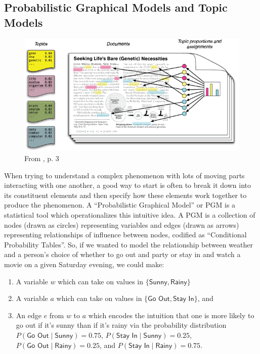 \begin{subappendices}

\section{Probabilistic Graphical Models and Topic Models\label{app:pgms}}

\begin{figure}
    \centering
    \includegraphics[width=\textwidth]{ch1_figs/blei_lda.png}
    \caption{From \cite{blei_introduction_2012}, p. 3}
    \label{fig:my_label}
\end{figure}

When trying to understand a complex phenomenon with lots of moving parts interacting with one another, a good way to start is often to break it down into its constituent elements and then specify how these elements work together to produce the phenomenon. A ``Probabilistic Graphical Model'' or PGM is a statistical tool which operationalizes this intuitive idea. A PGM is a collection of nodes (drawn as circles) representing variables and edges (drawn as arrows) representing relationships of influence between nodes, codified as ``Conditional Probability Tables''. So, if we wanted to model the relationship between weather and a person's choice of whether to go out and party or stay in and watch a movie on a given Saturday evening, we could make:

\begin{enumerate}
    \item A variable $w$ which can take on values in $\{\textsf{Sunny}, \textsf{Rainy}\}$
    \item A variable $a$ which can take on values in $\{\textsf{Go Out}, \textsf{Stay In}\}$, and 
    \item An edge $e$ from $w$ to $a$ which encodes the intuition that one is more likely to go out if it's sunny than if it's rainy via the probability distribution $P(\textsf{Go Out} \; | \; \textsf{Sunny}) = 0.75$, $P(\textsf{Stay In} \; | \; \textsf{Sunny}) = 0.25$, $P(\textsf{Go Out} \; | \; \textsf{Rainy}) = 0.25$, and $P(\textsf{Stay In} \; | \; \textsf{Rainy}) = 0.75$.
\end{enumerate}


\end{subappendices}
